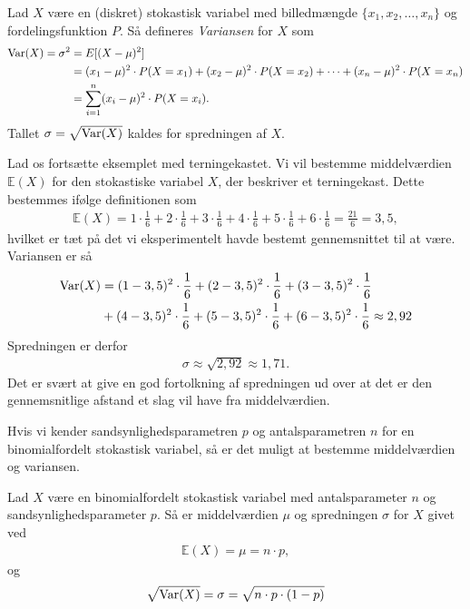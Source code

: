 \begin{defn}[Varians]
Lad $X$ være en (diskret) stokastisk variabel med billedmængde $\{x_1,x_2,\hdots,x_n\}$ og fordelingsfunktion $P$. Så defineres \textit{Variansen} for $X$ som
\begin{align*}
\textnormal{Var}(X) = \sigma^2 &= E[(X-\mu)^2]\\
&= (x_1-\mu)^2\cdot P(X=x_1) + (x_2-\mu)^2\cdot P(X=x_2)+\cdots + (x_n-\mu)^2 \cdot P(X=x_n)\\
&= \sum_{i=1}^n (x_i-\mu)^2\cdot P(X=x_i).
\end{align*}
Tallet $\sigma = \sqrt{\textnormal{Var}(X)}$ kaldes for spredningen af $X$. 
\end{defn}

\begin{exa}
Lad os fortsætte eksemplet med terningekastet. Vi vil bestemme middelværdien $\mathbb{E}(X)$ for den stokastiske variabel $X$, der beskriver et terningekast. Dette bestemmes ifølge definitionen som
\begin{align*}
\mathbb{E}(X) = 1\cdot \frac{1}{6} + 2\cdot \frac{1}{6}+3\cdot \frac{1}{6}+4\cdot \frac{1}{6}+5\cdot \frac{1}{6}+6\cdot \frac{1}{6} = \frac{21}{6} = 3,5,
\end{align*}
hvilket er tæt på det vi eksperimentelt havde bestemt gennemsnittet til at være. 
Variansen er så
\begin{align*}
\textnormal{Var}(X) &= (1-3,5)^2 \cdot \frac{1}{6} + (2-3,5)^2 \cdot \frac{1}{6} + (3-3,5)^2 \cdot \frac{1}{6}\\
 &+ (4-3,5)^2 \cdot \frac{1}{6} + (5-3,5)^2 \cdot \frac{1}{6} +(6-3,5)^2 \cdot \frac{1}{6} \approx 2,92
\end{align*}
Spredningen er derfor 
\begin{align*}
\sigma \approx \sqrt{2,92} \approx 1,71.
\end{align*}
Det er svært at give en god fortolkning af spredningen ud over at det er den gennemsnitlige afstand et slag vil have fra middelværdien. 
\end{exa}

Hvis vi kender sandsynlighedsparametren $p$ og antalsparametren $n$ for en binomialfordelt stokastisk variabel, så er det muligt at bestemme middelværdien og variansen.
\begin{setn}
Lad $X$ være en binomialfordelt stokastisk variabel med antalsparameter $n$ og sandsynlighedsparameter $p$. Så er middelværdien $\mu$ og spredningen $\sigma$ for $X$ givet ved
\begin{align*}
\mathbb{E}(X) = \mu = n\cdot p,
\end{align*} 
og 
\[
\sqrt{\textnormal{Var}(X)} = \sigma = \sqrt{n\cdot p\cdot (1-p)}
\]
\end{setn}

